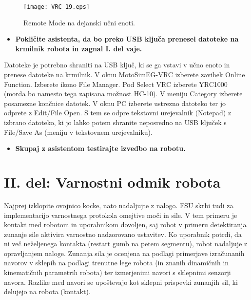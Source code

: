 \begin{figure}[hbt]
	\centering
	\texttt{[image: VRC\_19.eps]}
	\caption{Remote Mode na dejanski učni enoti.}
	\label{fig:VRC_19}
\end{figure}

\begin{mdframed}[backgroundcolor=red!20, shadow=true,roundcorner=8pt]
	\begin{itemize}
		\item \textbf{Pokličite asistenta, da bo preko USB ključa prenesel datoteke na krmilnik robota in zagnal I. del vaje.}
	\end{itemize}
\end{mdframed}
	
Datoteke je potrebno shraniti na USB ključ, ki se ga vstavi v učno enoto in prenese datoteke na krmilnik. V oknu MotoSimEG-VRC izberete zavihek Online Function. Izberete ikono File Manager. Pod Select VRC izberete YRC1000 (morda bo namesto tega zapisana možnost HC-10). V meniju Category izberete posamezne končnice datotek. V oknu PC izberete ustrezno datoteko ter jo odprete z Edit/File Open. S tem se odpre tekstovni urejevalnik (Notepad) z izbrano datoteko, ki jo lahko potem shranite neposredno na USB ključek s File/Save As (meniju v tekstovnem urejevalniku).


\begin{mdframed}[backgroundcolor=red!20, shadow=true,roundcorner=8pt]
	\begin{itemize}
		\item \textbf{Skupaj z asistentom testirajte izvedbo na robotu.}
	\end{itemize}
\end{mdframed}

\section{II. del: Varnostni odmik robota} \label{poglavje2del_vaje}

Najprej izklopite ovojnico kocke, nato nadaljujte z nalogo. FSU skrbi tudi za implementacijo varnostnega protokola omejtive moči in sile. V tem primeru je kontakt med robotom in uporabnikom dovoljen, saj robot v primeru detektiranja zunanje sile aktivira varnostno nadzorovano ustavitev. Ko uporabnik potrdi, da ni več neželjenega kontakta (restart gumb na petem segmentu), robot nadaljuje z opravljanjem naloge. Zunanja sila je ocenjena na podlagi primerjave izračunanih navorov v sklepih na podlagi trenutne lege robota (in znanih dinamičnih in kinematičnih parametrih robota) ter izmerjenimi navori s sklepnimi senzorji  navora. Razlike med navori se upoštevajo kot sklepni prispevki zunanjih sil, ki delujejo na robota (kontakt).

